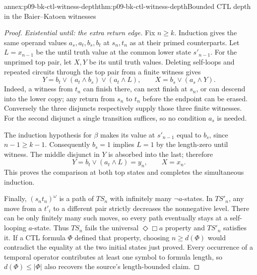 \begin{annexitem}{annex:p09-bk-ctl-witness-depth}{thm:p09-bk-ctl-witness-depth}{Bounded CTL depth in the Baier--Katoen witnesses}
\begin{proof}
\emph{Existential until: the extra return edge.} Fix \(n\geq k\).
Induction gives the same operand values \(a_s,a_t,b_s,b_t\) at
\(s_n,t_n\) as at their primed counterparts. Let \(L=x_{n-1}\)
be the until truth value at the common lower state \(s'_{n-1}\).
For the unprimed top pair, let \(X,Y\) be its until truth values.
Deleting self-loops and repeated circuits through the top pair from
a finite witness gives
\[
 Y=b_t\lor(a_t\land b_s)\lor(a_t\land L),
 \qquad X=b_s\lor(a_s\land Y).
\]
Indeed, a witness from \(t_n\) can finish there, can next finish
at \(s_n\), or can descend into the lower copy; any return from
\(s_n\) to \(t_n\) before the endpoint can be erased. Conversely
the three disjuncts respectively supply those three finite witnesses.
For the second disjunct a single transition suffices, so no condition
\(a_s\) is needed.

The induction hypothesis for \(\beta\) makes its value at
\(s'_{n-1}\) equal to \(b_s\), since \(n-1\geq k-1\).
Consequently \(b_s=1\) implies \(L=1\) by the length-zero until
witness. The middle disjunct in \(Y\) is absorbed into the last;
therefore
\[
 Y=b_t\lor(a_t\land L)=y_n,\qquad X=x_n.
\]
This proves the comparison at both top states and completes the
simultaneous induction.

Finally, \((s_nt_n)^\omega\) is a path of \(TS_n\) with infinitely
many \(\neg a\)-states. In \(TS'_n\), any move from a \(t'_i\)
to a different pair strictly decreases the nonnegative level. There
can be only finitely many such moves, so every path eventually stays
at a self-looping \(a\)-state. Thus \(TS_n\) fails the universal
\(\Diamond\Box a\) property and \(TS'_n\) satisfies it. If a CTL
formula \(\Phi\) defined that property, choosing
\(n\geq d(\Phi)\) would contradict the equality at the two initial
states just proved. Every occurrence of a temporal operator contributes
at least one symbol to formula length, so \(d(\Phi)\leq|\Phi|\)
also recovers the source's length-bounded claim.
\end{proof}
\end{annexitem}
